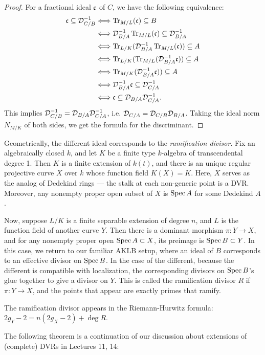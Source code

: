 \documentclass[11pt]{amsart}
\begin{document}
\begin{proof}
For a fractional ideal $\mathfrak{c}$ of $C$, we have the following equivalence:
\begin{align*}
    \mathfrak{c} \subseteq \mathcal{D}_{C/B}^{-1}
    &\Longleftrightarrow \operatorname{Tr}_{M/L}(\mathfrak{c}) \subseteq B \\
    &\Longleftrightarrow \mathcal{D}_{B/A}^{-1}\operatorname{Tr}_{M/L}(\mathfrak{c}) \subseteq \mathcal{D}_{B/A}^{-1} \\
    &\Longleftrightarrow \operatorname{Tr}_{L/K}(\mathcal{D}_{B/A}^{-1}\operatorname{Tr}_{M/L}(\mathfrak{c})) \subseteq A \\
    &\Longleftrightarrow \operatorname{Tr}_{L/K}(\operatorname{Tr}_{M/L}(\mathcal{D}_{B/A}^{-1}\mathfrak{c})) \subseteq A \\
    &\Longleftrightarrow \operatorname{Tr}_{M/K}(\mathcal{D}_{B/A}^{-1}\mathfrak{c})) \subseteq A \\
    &\Longleftrightarrow \mathcal{D}_{B/A}^{-1}\mathfrak{c} \subseteq \mathcal{D}_{C/A}^{-1} \\
    &\Longleftrightarrow \mathfrak{c} \subseteq \mathcal{D}_{B/A}\mathcal{D}_{C/A}^{-1}.
\end{align*}
This implies $\mathcal{D}_{C/B}^{-1} = \mathcal{D}_{B/A}\mathcal{D}_{C/A}^{-1}$, i.e. $\mathcal{D}_{C/A} = \mathcal{D}_{C/B}\mathcal{D}_{B/A}$. Taking the ideal norm $N_{M/K}$ of both sides, we get the formula for the discriminant.
\end{proof}

Geometrically, the different ideal corresponds to the \emph{ramification divisor}. Fix an algebraically closed $k$, and let $K$ be a finite type $k$-algebra of transcendental degree 1. Then $K$ is a finite extension of $k(t)$, and there is an unique regular projective curve $X$ over $k$ whose function field $K(X) = K$. Here, $X$ serves as the analog of Dedekind rings --- the stalk at each non-generic point is a DVR. Moreover, any nonempty proper open subset of $X$ is $\operatorname{Spec} A$ for some Dedekind $A$. 

Now, suppose $L/K$ is a finite separable extension of degree $n$, and $L$ is the function field of another curve $Y$. Then there is a dominant morphism $\pi: Y\to X$, and for any nonempty proper open $\operatorname{Spec} A\subset X$, its preimage is $\operatorname{Spec} B\subset Y$. In this case, we return to our familiar AKLB setup, where an ideal of $B$ corresponds to an effective divisor on $\operatorname{Spec} B$. In the case of the different, because the different is compatible with localization, the corresponding divisors on $\operatorname{Spec} B$'s glue together to give a divisor on $Y$. This is called the ramification divisor $R$ if $\pi: Y\to X$, and the points that appear are exactly primes that ramify.

The ramification divisor appears in the Riemann-Hurwitz formula: $2g_Y - 2 = n(2g_X - 2) + \deg R$.


The following theorem is a continuation of our discussion about extensions of (complete) DVRs in Lectures 11, 14:
\end{document}
